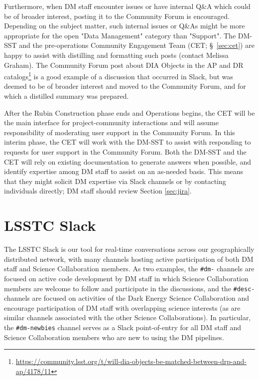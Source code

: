 \documentclass[DM,lsstdraft,authoryear,toc]{lsstdoc}
\begin{document}
Furthermore, when DM staff encounter issues or have internal Q\&A which could be of broader interest, posting it to the Community Forum is encouraged.
Depending on the subject matter, such internal issues or Q\&As might be more appropriate for the open "Data Management" category than "Support". 
The DM-SST and the pre-operations Community Engagement Team (CET; \S~\ref{sec:cet}) are happy to assist with distilling and formatting such posts (contact Melissa Graham).
The Community Forum post about DIA Objects in the AP and DR catalogs\footnote{\url{https://community.lsst.org/t/will-dia-objects-be-matched-between-drp-and-ap/4178/11}} is a good example of a discussion that occurred in Slack, but was deemed to be of broader interest and moved to the Community Forum, and for which a distilled summary was prepared.

After the Rubin Construction phase ends and Operations begins, the CET will be the main interface for project-community interactions and will assume responsibility of moderating user support in the Community Forum.
In this interim phase, the CET will work with the DM-SST to assist with responding to requests for user support in the Community Forum.
Both the DM-SST and the CET will rely on existing documentation to generate answers when possible, and identify expertise among DM staff to assist on an as-needed basis.
This means that they might solicit DM expertise via Slack channels or by contacting individuals directly; DM staff should review Section \ref{sec:jira}.

\section{LSSTC Slack}\label{sec:slack}

The LSSTC Slack is our tool for real-time conversations across our geographically distributed network, with many channels hosting active participation of both DM staff and Science Collaboration members.
As two examples, the {\tt \#dm-} channels are focused on active code development by DM staff in which Science Collaboration members are welcome to follow and participate in the discussions, and the {\tt \#desc-} channels are focused on activities of the Dark Energy Science Collaboration and encourage participation of DM staff with overlapping science interests (as are similar channels associated with the other Science Collaborations).
In particular, the {\tt \#dm-newbies} channel serves as a Slack point-of-entry for all DM staff and Science Collaboration members who are new to using the DM pipelines.
\end{document}
